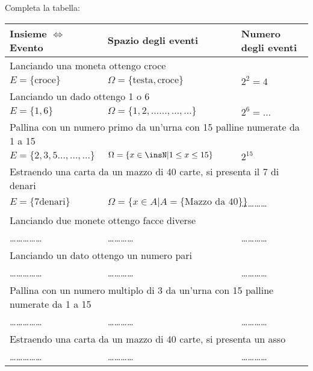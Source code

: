 \begin{esercizio}
 \label{ese:9.3}
Completa la tabella:
\begin{center}
\begin{tabular}{lll}
Insieme $\Leftrightarrow$ Evento & Spazio degli eventi & Numero degli eventi\\
\midrule
\multicolumn{3}{l}{Lanciando una moneta ottengo croce}\\
$ E=\{\text{croce}\} $ & $ \Omega =\{\text{testa},\text{croce}\} $ & $ 2^2=4 $\\
\midrule
\multicolumn{3}{l}{Lanciando un dado ottengo 1 o 6} \\
$ E=\{1,6\} $ & $ \Omega =\{1,2,\ldots \ldots, \ldots, \ldots\} $ & $ 2^6=\ldots $\\
\midrule
\multicolumn{3}{l}{Pallina con un numero primo da un'urna con 15 palline numerate da 1 a 15}\\
$ E=\{2,3,5\ldots,\ldots,\ldots\} $ & $ \Omega =\{x\in \insN| 1\le x\le 15\} $ & $ 2^{15} $\\
\midrule
\multicolumn{3}{l}{Estraendo una carta da un mazzo di 40 carte, si presenta il 7 di denari}\\
$ E=\{7\text{denari}\} $ & $ \Omega =\{x\in A| A=\{\text{Mazzo da 40}\}\} $ & \ldots\ldots\ldots\ldots\\
\midrule
\multicolumn{3}{l}{Lanciando due monete ottengo facce diverse}\\
\ldots \ldots \ldots \ldots \ldots & \ldots \ldots \ldots \ldots & \ldots \ldots \ldots \ldots\\
\midrule
\multicolumn{3}{l}{Lanciando un dato ottengo un numero pari}\\
\ldots \ldots \ldots \ldots \ldots & \ldots \ldots \ldots \ldots & \ldots \ldots \ldots \ldots\\
\midrule
\multicolumn{3}{l}{Pallina con un numero multiplo di 3 da un'urna con 15 palline numerate da 1 a 15}\\
\ldots \ldots \ldots \ldots \ldots & \ldots \ldots \ldots \ldots & \ldots \ldots \ldots \ldots\\
\midrule
\multicolumn{3}{l}{Estraendo una carta da un mazzo di 40 carte, si presenta un asso}\\
\ldots \ldots \ldots \ldots \ldots & \ldots \ldots \ldots \ldots & \ldots \ldots \ldots \ldots\\
\end{tabular}
\end{center}
\end{esercizio}
\newpage
